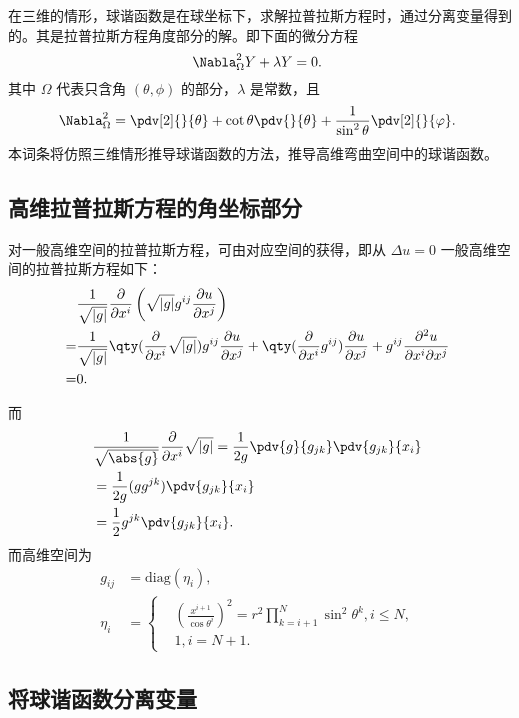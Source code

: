 

在三维的情形，球谐函数是在球坐标下，求解拉普拉斯方程时，通过分离变量得到的。其是拉普拉斯方程角度部分的解。即下面的微分方程
\begin{equation}
\Nabla_\Omega^2 Y+\lambda Y=0.~
\end{equation}
其中 $\Omega$ 代表只含角 $(\theta,\phi)$ 的部分，$\lambda$ 是常数，且
\begin{equation}
\Nabla^2_\Omega=\pdv[2]{}{\theta}+\cot\theta\pdv{}{\theta}+\frac{1}{\sin^2\theta}\pdv[2]{}{\varphi}.~
\end{equation}
本词条将仿照三维情形推导球谐函数的方法，推导高维弯曲空间中的球谐函数。

\subsection{高维拉普拉斯方程的角坐标部分}
对一般高维空间的拉普拉斯方程，可由对应空间的获得，即从 $\Delta u=0$ 一般高维空间的拉普拉斯方程如下：
\begin{equation}
\begin{aligned}
&\frac{1}{\sqrt{ \left\lvert g \right\rvert }} \frac{\partial }{\partial x^i} \left(\sqrt{ \left\lvert g \right\rvert }g^{ij} \frac{\partial u}{\partial x^j} \right)\\
=&\frac{1}{\sqrt{ \left\lvert g \right\rvert }} \qty(\frac{\partial }{\partial x^i} \sqrt{ \left\lvert g \right\rvert })g^{ij} \frac{\partial u}{\partial x^j}+\qty(\frac{\partial }{\partial x^i} g^{ij}) \frac{\partial u}{\partial x^j}+g^{ij}\frac{\partial^2 u}{\partial x^i\partial x^j}\\
=&0 .
\end{aligned}~
\end{equation}

而
\begin{equation}
\begin{aligned}
&\frac{1}{\sqrt{\abs{ g}}}\frac{\partial }{\partial x^i} \sqrt{ \left\lvert g \right\rvert }=\frac{1}{2g}\pdv{g}{g_{jk}}\pdv{g_{jk}}{x_i}\\
&=\frac{1}{2g}(gg^{jk})\pdv{g_{jk}}{x_i}\\
&=\frac{1}{2}g^{jk}\pdv{g_{jk}}{x_i}.
\end{aligned}~
\end{equation}
而高维空间为
\begin{equation}
\begin{aligned}
g_{ij}&=\mathrm{diag}(\eta_i),\\
\eta_{i}&=\left\{\begin{aligned}
& \left(\frac{x^{i+1}}{\cos\theta^i} \right) ^2=r^2\prod\limits_{k=i+1}^{N}\sin^2\theta^{k},i\leq N,\\
&1,i=N+1.
\end{aligned}\right.
\end{aligned}~
\end{equation}


\subsection{将球谐函数分离变量}









